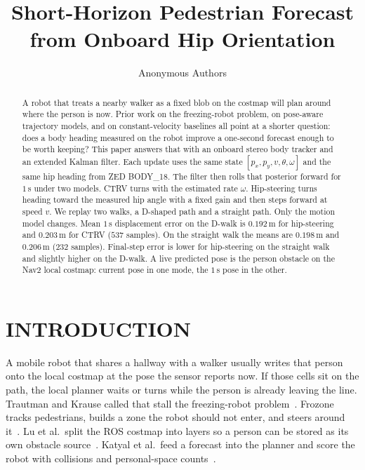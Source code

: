 \documentclass[letterpaper, 10pt, conference]{IEEEtran}
\title{\LARGE \bf
Short-Horizon Pedestrian Forecast from Onboard Hip Orientation
}
\author{Anonymous Authors}
\begin{document}
\maketitle
\thispagestyle{empty}
\pagestyle{empty}

\begin{abstract}
A robot that treats a nearby walker as a fixed blob on the costmap will plan
around where the person is now. Prior work on the freezing-robot problem,
on pose-aware trajectory models, and on constant-velocity baselines all
point at a shorter question: does a body heading measured on the robot
improve a one-second forecast enough to be worth keeping? This paper
answers that with an onboard stereo body tracker and an extended Kalman
filter. Each update uses the same state
$[p_x,p_y,v,\theta,\omega]$ and the same hip heading from ZED BODY\_18.
The filter then rolls that posterior forward for $1$\,s under two
models. CTRV turns with the estimated rate $\omega$. Hip-steering turns
heading toward the measured hip angle with a fixed gain and then steps
forward at speed $v$. We replay two walks, a D-shaped path and a
straight path. Only the motion model changes. Mean $1$\,s displacement
error on the D-walk is $0.192$\,m for hip-steering and $0.203$\,m for
CTRV ($537$ samples). On the straight walk the means are $0.198$\,m and
$0.206$\,m ($232$ samples). Final-step error is lower for hip-steering
on the straight walk and slightly higher on the D-walk. A live predicted
pose is the person obstacle on the Nav2 local costmap: current pose in
one mode, the $1$\,s pose in the other.
\end{abstract}

\section{INTRODUCTION}

A mobile robot that shares a hallway with a walker usually writes that
person onto the local costmap at the pose the sensor reports now. If those
cells sit on the path, the local planner waits or turns while the person is
already leaving the line. Trautman and Krause called that stall the
freezing-robot problem~\cite{trautman2010unfreezing}. Frozone tracks
pedestrians, builds a zone the robot should not enter, and steers around
it~\cite{sathyamoorthy2020frozone}. Lu et al.\ split the ROS costmap into
layers so a person can be stored as its own obstacle
source~\cite{lu2014layered}. Katyal et al.\ feed a forecast into the
planner and score the robot with collisions and personal-space
counts~\cite{katyal2020intent}.
\end{document}
